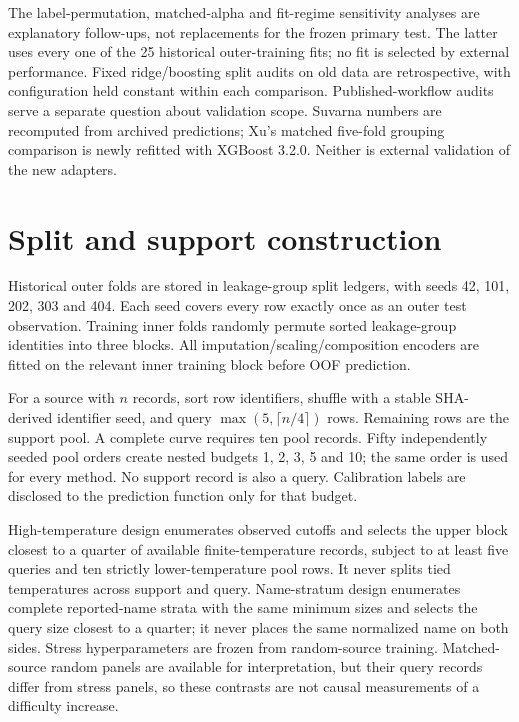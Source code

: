 \documentclass[11pt]{article}
\begin{document}
The label-permutation, matched-alpha and fit-regime sensitivity analyses are explanatory follow-ups, not replacements for the frozen primary test. The latter uses every one of the 25 historical outer-training fits; no fit is selected by external performance. Fixed ridge/boosting split audits on old data are retrospective, with configuration held constant within each comparison. Published-workflow audits serve a separate question about validation scope. Suvarna numbers are recomputed from archived predictions; Xu's matched five-fold grouping comparison is newly refitted with XGBoost 3.2.0. Neither is external validation of the new adapters.

\section{Split and support construction}
Historical outer folds are stored in leakage-group split ledgers, with seeds 42, 101, 202, 303 and 404. Each seed covers every row exactly once as an outer test observation. Training inner folds randomly permute sorted leakage-group identities into three blocks. All imputation/scaling/composition encoders are fitted on the relevant inner training block before OOF prediction.

For a source with $n$ records, sort row identifiers, shuffle with a stable SHA-derived identifier seed, and query $\max(5,\lceil n/4\rceil)$ rows. Remaining rows are the support pool. A complete curve requires ten pool records. Fifty independently seeded pool orders create nested budgets 1, 2, 3, 5 and 10; the same order is used for every method. No support record is also a query. Calibration labels are disclosed to the prediction function only for that budget.

High-temperature design enumerates observed cutoffs and selects the upper block closest to a quarter of available finite-temperature records, subject to at least five queries and ten strictly lower-temperature pool rows. It never splits tied temperatures across support and query. Name-stratum design enumerates complete reported-name strata with the same minimum sizes and selects the query size closest to a quarter; it never places the same normalized name on both sides. Stress hyperparameters are frozen from random-source training. Matched-source random panels are available for interpretation, but their query records differ from stress panels, so these contrasts are not causal measurements of a difficulty increase.
\end{document}
